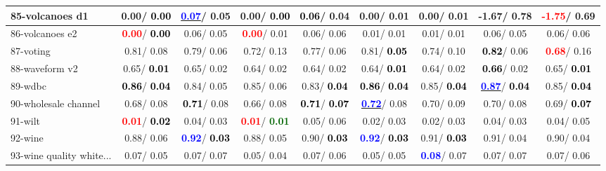 \begin{table}[h]
\begin{center}
\begin{tabular}{lc|c|c|c|c|c|c|c}
85-volcanoes d1 &   0.00/\textcolor{black}{\textbf{  0.00}} & \underline{\textcolor{blue}{\textbf{  0.07}}}/  0.05 &   0.00/\textcolor{black}{\textbf{  0.00}} & \textcolor{black}{\textbf{  0.06}}/  0.04 &   0.00/  0.01 &   0.00/  0.01 &  -1.67/  0.78 & \textcolor{red}{\textbf{ -1.75}}/  0.69 \\ \hline
86-volcanoes e2 & \textcolor{red}{\textbf{  0.00}}/\textcolor{black}{\textbf{  0.00}} &   0.06/  0.05 & \textcolor{red}{\textbf{  0.00}}/  0.01 &   0.06/  0.06 &   0.01/  0.01 &   0.01/  0.01 &   0.06/  0.05 &   0.06/  0.06 \\
87-voting &   0.81/  0.08 &   0.79/  0.06 &   0.72/  0.13 &   0.77/  0.06 &   0.81/\textcolor{black}{\textbf{  0.05}} &   0.74/  0.10 & \textcolor{black}{\textbf{  0.82}}/  0.06 & \textcolor{red}{\textbf{  0.68}}/  0.16 \\
88-waveform v2 &   0.65/\textcolor{black}{\textbf{  0.01}} &   0.65/  0.02 &   0.64/  0.02 &   0.64/  0.02 &   0.64/\textcolor{black}{\textbf{  0.01}} &   0.64/  0.02 & \textcolor{black}{\textbf{  0.66}}/  0.02 &   0.65/\textcolor{black}{\textbf{  0.01}} \\
89-wdbc & \textcolor{black}{\textbf{  0.86}}/\textcolor{black}{\textbf{  0.04}} &   0.84/  0.05 &   0.85/  0.06 &   0.83/\textcolor{black}{\textbf{  0.04}} & \textcolor{black}{\textbf{  0.86}}/\textcolor{black}{\textbf{  0.04}} &   0.85/\textcolor{black}{\textbf{  0.04}} & \underline{\textcolor{blue}{\textbf{  0.87}}}/\textcolor{black}{\textbf{  0.04}} &   0.85/\textcolor{black}{\textbf{  0.04}} \\
90-wholesale channel &   0.68/  0.08 & \textcolor{black}{\textbf{  0.71}}/  0.08 &   0.66/  0.08 & \textcolor{black}{\textbf{  0.71}}/\textcolor{black}{\textbf{  0.07}} & \underline{\textcolor{blue}{\textbf{  0.72}}}/  0.08 &   0.70/  0.09 &   0.70/  0.08 &   0.69/\textcolor{black}{\textbf{  0.07}} \\
91-wilt & \textcolor{red}{\textbf{  0.01}}/\textcolor{black}{\textbf{  0.02}} &   0.04/  0.03 & \textcolor{red}{\textbf{  0.01}}/\textcolor{darkgreen}{\textbf{  0.01}} &   0.05/  0.06 &   0.02/  0.03 &   0.02/  0.03 &   0.04/  0.03 &   0.04/  0.05 \\
92-wine &   0.88/  0.06 & \textcolor{blue}{\textbf{  0.92}}/\textcolor{black}{\textbf{  0.03}} &   0.88/  0.05 &   0.90/\textcolor{black}{\textbf{  0.03}} & \textcolor{blue}{\textbf{  0.92}}/\textcolor{black}{\textbf{  0.03}} &   0.91/\textcolor{black}{\textbf{  0.03}} &   0.91/  0.04 &   0.90/  0.04 \\ \hline
93-wine quality white... &   0.07/  0.05 &   0.07/  0.07 &   0.05/  0.04 &   0.07/  0.06 &   0.05/  0.05 & \textcolor{blue}{\textbf{  0.08}}/  0.07 &   0.07/  0.07 &   0.07/  0.06 \\

\end{tabular}
\end{center}
\end{table}
